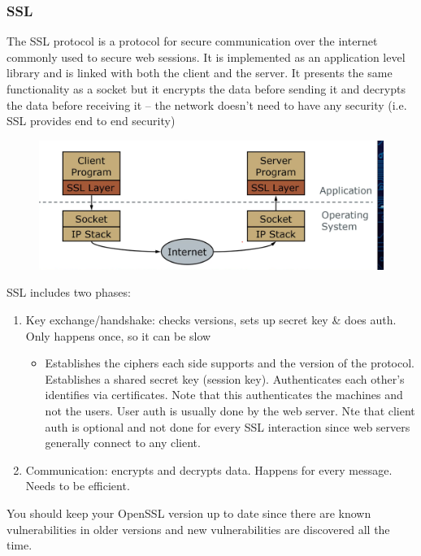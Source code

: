 \documentclass[../notes.tex]{subfiles}
\begin{document}
\subsubsection{SSL}

The SSL protocol is a protocol for secure communication over the internet commonly used to secure web sessions.
It is implemented as an application level library and is linked with both the client and the server. 
It presents the same functionality as a socket but it encrypts the data before sending it and decrypts the data before receiving it -- the network doesn't need to have any security (i.e. SSL provides end to end security)

\begin{figure}[H]
    \centering
    \includegraphics[width=0.8\linewidth]{img/image_2023-03-12-19-11-33.png}
\end{figure}


SSL includes two phases:

\begin{enumerate}
    \item Key exchange/handshake: checks versions, sets up secret key \& does auth. Only happens once, so it can be slow
        \begin{itemize}
            \item Establishes the ciphers each side supports and the version of the protocol. Establishes a shared secret key (session key). Authenticates each other's identifies via certificates. Note that this authenticates the machines and not the users. User auth is usually done by the web server. Nte that client auth is optional and not done for every SSL interaction since web servers generally connect to any client.
        \end{itemize}
    \item Communication: encrypts and decrypts data. Happens for every message. Needs to be efficient.
\end{enumerate}


\begin{blockquote}
    You should keep your OpenSSL version up to date since there are known vulnerabilities in older versions and new vulnerabilities are discovered all the time.
\end{blockquote}
\end{document}
